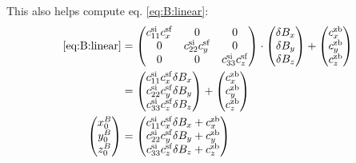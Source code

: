 This also helps compute eq. \eqref{eq:B:linear}:
\begin{align}
    \eqref{eq:B:linear}
    &=
    \begin{pmatrix}
    c^\mathrm{si}_{11}c_x^{\mathrm{sf}} & 0 & 0 \\
    0 & c^\mathrm{si}_{22}c_y^{\mathrm{sf}} & 0 \\
    0 & 0 & c^\mathrm{si}_{33}c_z^{\mathrm{sf}} 
    \end{pmatrix}
    \cdot\begin{pmatrix}
         \delta B_x \\
         \delta B_y \\
         \delta B_z   
    \end{pmatrix}
    +\begin{pmatrix}
        c^{\mathrm{zb}}_x \\
        c^{\mathrm{zb}}_y \\
        c^{\mathrm{zb}}_z 
    \end{pmatrix}
    \nonumber \\ 
    &= 
    \begin{pmatrix}
        c^\mathrm{si}_{11}c_x^{\mathrm{sf}}\delta B_x \\
        c^\mathrm{si}_{22}c_y^{\mathrm{sf}}\delta B_y \\
        c^\mathrm{si}_{33}c_z^{\mathrm{sf}}\delta B_z 
    \end{pmatrix}
    +\begin{pmatrix}
        c^{\mathrm{zb}}_x \\
        c^{\mathrm{zb}}_y \\
        c^{\mathrm{zb}}_z 
    \end{pmatrix} \nonumber\\
    \begin{pmatrix}
    x_0^B \\ 
    y_0^B \\ 
    z_0^B
    \end{pmatrix}
    &=
    \begin{pmatrix}
        c^\mathrm{si}_{11}c_x^{\mathrm{sf}}\delta B_x + c^{\mathrm{zb}}_x\\
        c^\mathrm{si}_{22}c_y^{\mathrm{sf}}\delta B_y + c^{\mathrm{zb}}_y\\
        c^\mathrm{si}_{33}c_z^{\mathrm{sf}}\delta B_z +c^{\mathrm{zb}}_z
    \end{pmatrix}
\end{align}

